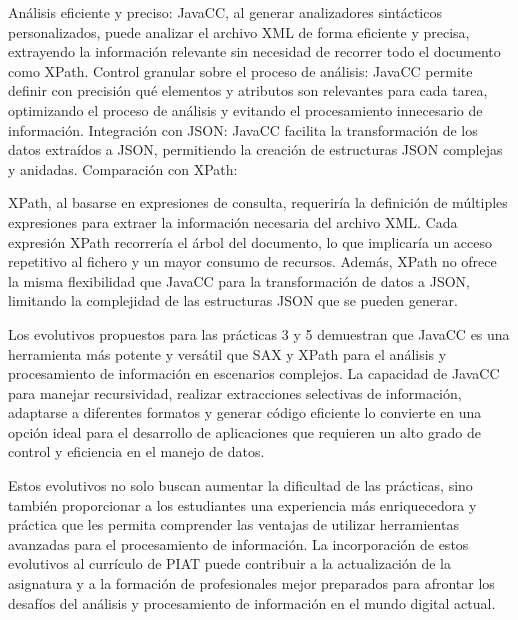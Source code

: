 Análisis eficiente y preciso: JavaCC, al generar analizadores sintácticos personalizados, puede analizar el archivo XML de forma eficiente y precisa, extrayendo la información relevante sin necesidad de recorrer todo el documento como XPath.
Control granular sobre el proceso de análisis: JavaCC permite definir con precisión qué elementos y atributos son relevantes para cada tarea, optimizando el proceso de análisis y evitando el procesamiento innecesario de información.
Integración con JSON: JavaCC facilita la transformación de los datos extraídos a JSON, permitiendo la creación de estructuras JSON complejas y anidadas.
Comparación con XPath:

XPath, al basarse en expresiones de consulta, requeriría la definición de múltiples expresiones para extraer la información necesaria del archivo XML. Cada expresión XPath recorrería el árbol del documento, lo que implicaría un acceso repetitivo al fichero y un mayor consumo de recursos. Además, XPath no ofrece la misma flexibilidad que JavaCC para la transformación de datos a JSON, limitando la complejidad de las estructuras JSON que se pueden generar.



Los evolutivos propuestos para las prácticas 3 y 5 demuestran que JavaCC es una herramienta más potente y versátil que SAX y XPath para el análisis y procesamiento de información en escenarios complejos. La capacidad de JavaCC para manejar recursividad, realizar extracciones selectivas de información, adaptarse a diferentes formatos y generar código eficiente lo convierte en una opción ideal para el desarrollo de aplicaciones que requieren un alto grado de control y eficiencia en el manejo de datos.

Estos evolutivos no solo buscan aumentar la dificultad de las prácticas, sino también proporcionar a los estudiantes una experiencia más enriquecedora y práctica que les permita comprender las ventajas de utilizar herramientas avanzadas para el procesamiento de información. La incorporación de estos evolutivos al currículo de PIAT puede contribuir a la actualización de la asignatura y a la formación de profesionales mejor preparados para afrontar los desafíos del análisis y procesamiento de información en el mundo digital actual.
